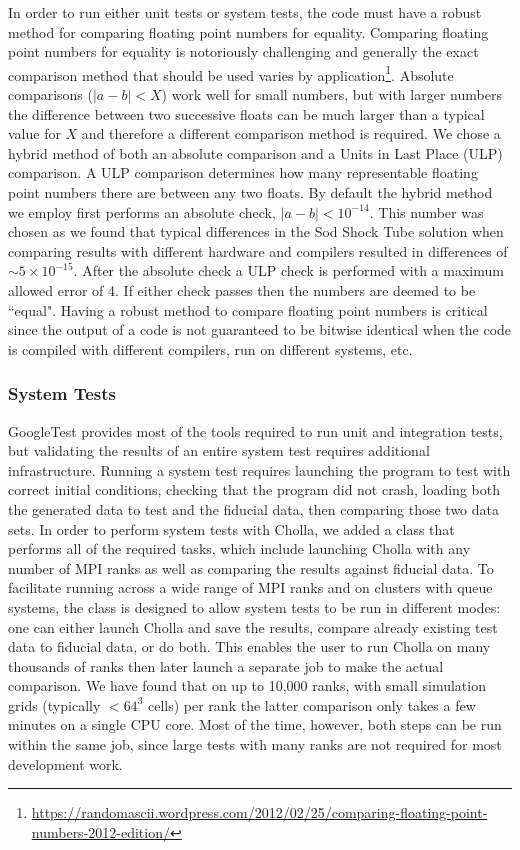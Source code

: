 \documentclass[modern]{aastex631}
\begin{document}
In order to run either unit tests or system tests, the code must have a robust method for comparing floating point numbers for equality. Comparing floating point numbers for equality is notoriously challenging and generally the exact comparison method that should be used varies by application\citep{goldberg_1991,muller_2018}\footnote{\url{https://randomascii.wordpress.com/2012/02/25/comparing-floating-point-numbers-2012-edition/}}. Absolute comparisons ($|a-b| < X$) work well for small numbers, but with larger numbers the difference between two successive floats can be much larger than a typical value for $X$ and therefore a different comparison method is required. We chose a hybrid method of both an absolute comparison and a Units in Last Place (ULP) comparison. A ULP comparison determines how many representable floating point numbers there are between any two floats. By default the hybrid method we employ first performs an absolute check, $|a-b| < 10^{-14}$. This number was chosen as we found that typical differences in the Sod Shock Tube solution when comparing results with different hardware and compilers resulted in differences of $\sim5\times10^{-15}$. After the absolute check a ULP check is performed with a maximum allowed error of 4. If either check passes then the numbers are deemed to be ``equal". Having a robust method to compare floating point numbers is critical since the output of a code is not guaranteed to be bitwise identical when the code is compiled with different compilers, run on different systems, etc.

\subsubsection{System Tests}

GoogleTest provides most of the tools required to run unit and integration tests, but validating the results of an entire system test requires additional infrastructure. Running a system test requires launching the program to test with correct initial conditions, checking that the program did not crash, loading both the generated data to test and the fiducial data, then comparing those two data sets. In order to perform system tests with Cholla, we added a class that performs all of the required tasks, which include launching Cholla with any number of MPI ranks as well as comparing the results against fiducial data. To facilitate running across a wide range of MPI ranks and on clusters with queue systems, the class is designed to allow system tests to be run in different modes: one can either launch Cholla and save the results, compare already existing test data to fiducial data, or do both. This enables the user to run Cholla on many thousands of ranks then later launch a separate job to make the actual comparison. We have found that on up to 10,000 ranks, with small simulation grids (typically $<64^3$ cells) per rank the latter comparison only takes a few minutes on a single CPU core. Most of the time, however, both steps can be run within the same job, since large tests with many ranks are not required for most development work.
\end{document}
